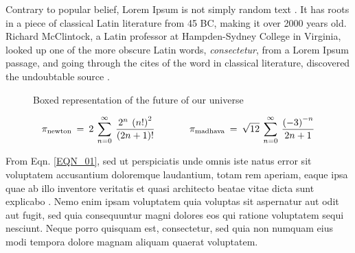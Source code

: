 \documentclass[letterpaper,12pt,fleqn]{article}
\begin{document}
Contrary to popular belief, Lorem Ipsum is not simply random 
text \cite{GN2006, EPR1935}. It has roots in a piece of classical Latin 
literature from 45 BC, making it over 2000 years old. Richard McClintock, 
a Latin professor at Hampden-Sydney College in Virginia, looked up one of 
the more obscure Latin words, \textsl{consectetur}, from a Lorem Ipsum 
passage, and going through the cites of the word in classical literature, 
discovered the undoubtable source \cite{WC1953}.
\begin{figure}[hbt]
  \begin{center}
    \caption{Boxed representation of the future of our universe}
    \label{FIG01}
  \end{center}
\end{figure}
\begin{equation}
  \pi_{\mathrm{newton}} \:=\: 2 \:\sum_{n=0}^{\infty}\:\frac{2^{n}\:\left(n!\right)^{2}}{\left(2n+1\right)!}
  \hspace{0.50in}
  \pi_{\mathrm{madhava}} \:=\: \sqrt{12}\:\sum_{n=0}^{\infty}\:\frac{\left(-3\right)^{-n}}{2n + 1}
  \label{EQN_01}
\end{equation}

From Eqn. \eqref{EQN_01}, sed ut perspiciatis unde omnis 
iste natus error sit voluptatem accusantium doloremque laudantium, totam rem 
aperiam, eaque ipsa quae ab illo inventore veritatis et quasi architecto 
beatae vitae dicta sunt explicabo \cite{GN2006, EPR1935, WC1953}. Nemo enim 
ipsam voluptatem quia voluptas sit aspernatur aut odit aut fugit, sed quia 
consequuntur magni dolores eos qui ratione voluptatem sequi nesciunt. Neque
porro quisquam est, consectetur, sed quia non numquam eius modi tempora 
dolore magnam aliquam quaerat voluptatem.
\end{document}
